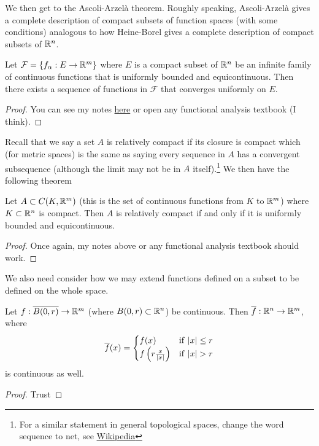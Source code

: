 We then get to the Ascoli-Arzelà theorem. Roughly speaking, Ascoli-Arzelà gives a complete description of compact subsets of function spaces (with some conditions) analogous to how Heine-Borel gives a complete description of compact subsets of $\mathbb{R}^n$.
\begin{theorem}\label{thm:ascoli}
    Let $\mathcal{F} = \{f_\alpha: E \to \mathbb{R}^m\}$ where $E$ is a compact subset of $\mathbb{R}^n$ be an infinite family of continuous functions that is uniformly bounded and equicontinuous. Then there exists a sequence of functions in $\mathcal{F}$ that converges uniformly on $E$.
\end{theorem}
\begin{proof}
You can see my notes \href{http://individual.utoronto.ca/rishibhp/notes/ascoli_arzela_thm.pdf}{here} or open any functional analysis textbook (I think).
\end{proof}

Recall that we say a set $A$ is relatively compact if its closure is compact which (for metric spaces) is the same as saying every sequence in $A$ has a convergent subsequence (although the limit may not be in $A$ itself).\footnote{For a similar statement in general topological spaces, change the word sequence to net, see \href{https://en.wikipedia.org/wiki/Net_(mathematics)}{Wikipedia}} We then have the following theorem
\begin{theorem}\label{thm:rel-compact-equiv}
    Let $A \subset C(K, \mathbb{R}^m)$ (this is the set of continuous functions from $K$ to $\mathbb{R}^m$) where $K \subset \mathbb{R}^n$ is compact. Then $A$ is relatively compact if and only if it is uniformly bounded and equicontinuous.
\end{theorem}
\begin{proof}
Once again, my notes above or any functional analysis textbook should work.
\end{proof}

We also need consider how we may extend functions defined on a subset to be defined on the whole space.
\begin{theorem}\label{thm:cont-ext}
    Let $f: \overline{B(0, r)} \to \mathbb{R}^m$ (where $B(0, r) \subset \mathbb{R}^n$) be continuous. Then $\overline{f}: \mathbb{R}^n \to \mathbb{R}^m$, where
    \begin{align*}
        \overline{f}(x) = 
        \begin{cases}
            f(x) & \mathrm{if } \ |x| \leq r\\
            f\left(r \frac{x}{|x|}\right) &\mathrm{if } \ |x| > r
        \end{cases}
    \end{align*}
    is continuous as well.
\end{theorem}
\begin{proof}
Trust
\end{proof}

